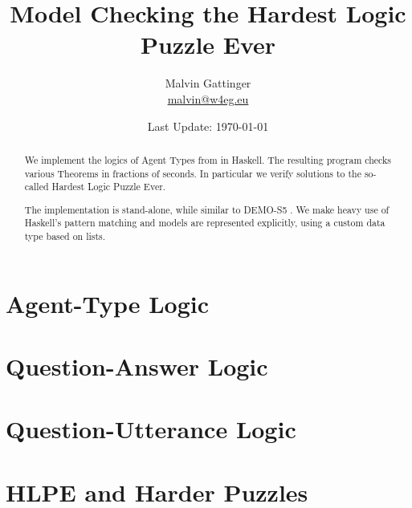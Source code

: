 \documentclass[12pt,a4paper]{article}
\title{Model Checking the Hardest Logic Puzzle Ever}
\author{Malvin Gattinger \\ \href{mailto:malvin@w4eg.eu}{malvin@w4eg.eu}}
\date{Last Update: \today}
\begin{document}
\maketitle

\begin{abstract}
We implement the logics of Agent Types from \cite{liuWang2013:agentTypesHLPE} in Haskell.
The resulting program checks various Theorems in fractions of seconds.
In particular we verify solutions to the so-called Hardest Logic Puzzle Ever.

The implementation is stand-alone, while similar to DEMO-S5 \cite{JvE:DEMO}.
We make heavy use of Haskell's pattern matching and models are represented explicitly, using a custom data type based on lists.
\end{abstract}

\vfill

\tableofcontents

\section{Agent-Type Logic}


\section{Question-Answer Logic}


\section{Question-Utterance Logic}


\section{HLPE and Harder Puzzles}




\end{document}

